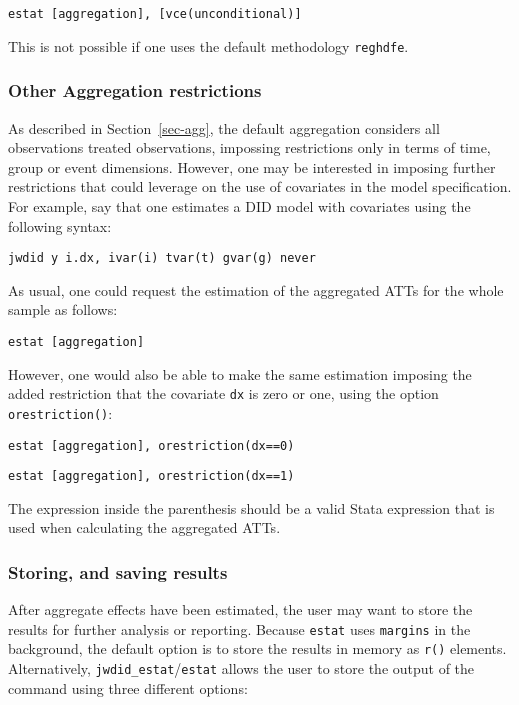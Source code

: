 \documentclass[
  letterpaper,
  DIV=11,
  numbers=noendperiod]{scrartcl}
\begin{document}
\texttt{estat\ {[}aggregation{]},\ {[}vce(unconditional){]}}

This is not possible if one uses the default methodology
\texttt{reghdfe}.

\subsubsection{Other Aggregation
restrictions}\label{other-aggregation-restrictions}

As described in Section~\ref{sec-agg}, the default aggregation considers
all observations treated observations, impossing restrictions only in
terms of time, group or event dimensions. However, one may be interested
in imposing further restrictions that could leverage on the use of
covariates in the model specification. For example, say that one
estimates a DID model with covariates using the following syntax:

\texttt{jwdid\ y\ i.dx,\ ivar(i)\ tvar(t)\ gvar(g)\ never}

As usual, one could request the estimation of the aggregated ATTs for
the whole sample as follows:

\texttt{estat\ {[}aggregation{]}}

However, one would also be able to make the same estimation imposing the
added restriction that the covariate \texttt{dx} is zero or one, using
the option \texttt{orestriction()}:

\texttt{estat\ {[}aggregation{]},\ orestriction(dx==0)}

\texttt{estat\ {[}aggregation{]},\ orestriction(dx==1)}

The expression inside the parenthesis should be a valid Stata expression
that is used when calculating the aggregated ATTs.

\subsubsection{Storing, and saving
results}\label{storing-and-saving-results}

After aggregate effects have been estimated, the user may want to store
the results for further analysis or reporting. Because \texttt{estat}
uses \texttt{margins} in the background, the default option is to store
the results in memory as \texttt{r()} elements. Alternatively,
\texttt{jwdid\_estat}/\texttt{estat} allows the user to store the output
of the command using three different options:
\end{document}
